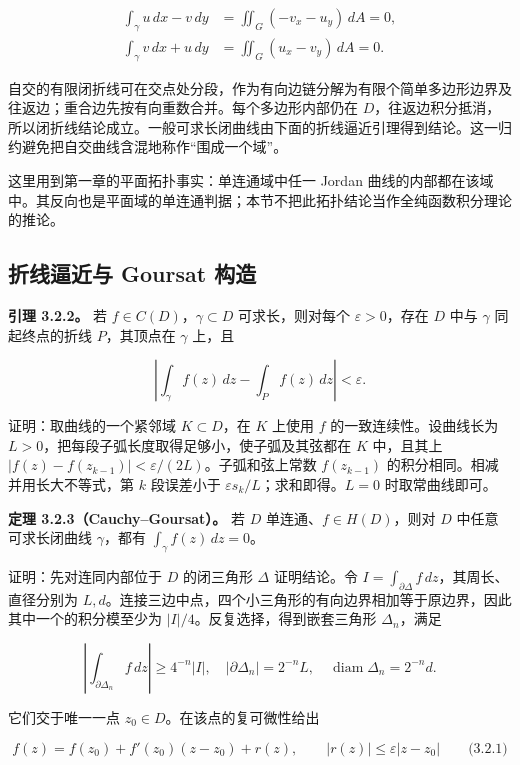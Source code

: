\documentclass[11pt,a4paper]{article}
\begin{document}
\[
\begin{aligned}
\int_\gamma u\,dx-v\,dy
&=\iint_G(-v_x-u_y)\,dA=0,\\
\int_\gamma v\,dx+u\,dy
&=\iint_G(u_x-v_y)\,dA=0.
\end{aligned}
\]

自交的有限闭折线可在交点处分段，作为有向边链分解为有限个简单多边形边界及往返边；重合边先按有向重数合并。每个多边形内部仍在
\(D\)，往返边积分抵消，所以闭折线结论成立。一般可求长闭曲线由下面的折线逼近引理得到结论。这一归约避免把自交曲线含混地称作``围成一个域''。

这里用到第一章的平面拓扑事实：单连通域中任一 Jordan
曲线的内部都在该域中。其反向也是平面域的单连通判据；本节不把此拓扑结论当作全纯函数积分理论的推论。

\subsection{折线逼近与 Goursat
构造}\label{ch03-s2-ux6298ux7ebfux903cux8fd1ux4e0e-goursat-ux6784ux9020}

\textbf{引理 3.2.2。} 若 \(f\in C(D)\)，\(\gamma\subset D\)
可求长，则对每个 \(\varepsilon>0\)，存在 \(D\) 中与 \(\gamma\)
同起终点的折线 \(P\)，其顶点在 \(\gamma\) 上，且

\[
\left|\int_\gamma f(z)\,dz-\int_P f(z)\,dz\right|<\varepsilon.
\]

证明：取曲线的一个紧邻域 \(K\subset D\)，在 \(K\) 上使用 \(f\)
的一致连续性。设曲线长为
\(L>0\)，把每段子弧长度取得足够小，使子弧及其弦都在 \(K\) 中，且其上
\(|f(z)-f(z_{k-1})|<\varepsilon/(2L)\)。子弧和弦上常数 \(f(z_{k-1})\)
的积分相同。相减并用长大不等式，第 \(k\) 段误差小于
\(\varepsilon s_k/L\)；求和即得。\(L=0\) 时取常曲线即可。

\textbf{定理 3.2.3（Cauchy--Goursat）。} 若 \(D\)
单连通、\(f\in H(D)\)，则对 \(D\) 中任意可求长闭曲线 \(\gamma\)，都有
\(\int_\gamma f(z)\,dz=0\)。

证明：先对连同内部位于 \(D\) 的闭三角形 \(\Delta\) 证明结论。令
\(I=\int_{\partial\Delta}f\,dz\)，其周长、直径分别为
\(L,d\)。连接三边中点，四个小三角形的有向边界相加等于原边界，因此其中一个的积分模至少为
\(|I|/4\)。反复选择，得到嵌套三角形 \(\Delta_n\)，满足

\[
\left|\int_{\partial\Delta_n}f\,dz\right|\ge4^{-n}|I|,
\quad |\partial\Delta_n|=2^{-n}L,
\quad\operatorname{diam}\Delta_n=2^{-n}d.
\]

它们交于唯一一点 \(z_0\in D\)。在该点的复可微性给出

\[
f(z)=f(z_0)+f'(z_0)(z-z_0)+r(z),
\qquad |r(z)|\le\varepsilon|z-z_0|
\qquad\text{(3.2.1)}
\]
\end{document}
